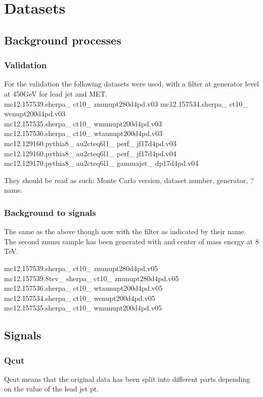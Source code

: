 \chapter{Datasets}\label{cha:datasets}
\section{Background processes}
\subsection{Validation}
For the validation the following datasets were used, with a filter at generator level at 450GeV for lead jet and MET. \\
mc12.157539.sherpa\_ ct10\_ znunupt280d4pd.v03
mc12.157534.sherpa\_  ct10\_  wenupt200d4pd.v03\\
mc12.157535.sherpa\_  ct10\_  wmunupt200d4pd.v03\\
mc12.157536.sherpa\_  ct10\_  wtaunupt200d4pd.v03\\
mc12.129160.pythia8\_  au2cteq6l1\_  perf\_  jf17d4pd.v03\\
mc12.129160.pythia8\_  au2cteq6l1\_  perf\_  jf17d4pd.v04\\
mc12.129170.pythia8\_  au2cteq6l1\_  gammajet\_  dp17d4pd.v04

They should be read as such: Monte Carlo version, dataset number, generator, ? name.

\subsection{Background to signals}
The same as the above though now with the filter as indicated by their name. The second znunu sample has been generated with and center of mass energy at 8 TeV. 

mc12.157539.sherpa\_  ct10\_  znunupt280d4pd.v05\\
mc12.157539.8tev\_  sherpa\_  ct10\_  znunupt280d4pd.v05\\
mc12.157536.sherpa\_  ct10\_  wtaunupt200d4pd.v05\\
mc12.157534.sherpa\_  ct10\_  wenupt200d4pd.v05\\
mc12.157535.sherpa\_  ct10\_  wmunupt200d4pd.v05
\section{Signals}
\subsection{Qcut}
Qcut means that the original data has been split into different parts depending on the value of the lead jet pt. 

